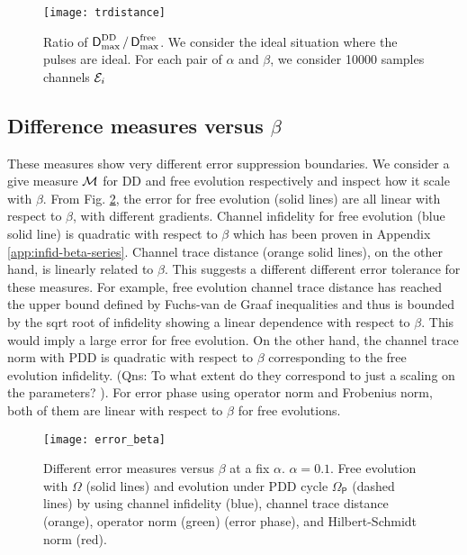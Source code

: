 \documentclass[aps,pra,reprint,superscriptaddress]{revtex4-2}
\newcommand{\Opdd}{\Omega_{\mathsf{P}}}
\begin{document}
\begin{figure}
    \centering
    \texttt{[image: trdistance]}
    \caption{Ratio of $\operatorname{\mathsf{D}}^{\rm DD}_{\rm max} / \operatorname{\mathsf{D}}^{\rm free}_{\rm max}$. We consider the ideal situation where the pulses are ideal. For each pair of $\alpha$ and $\beta$, we consider 10000 samples channels ${\mathcal{E}}_i$} 
    \label{fig:pdd-region-trdistance}
\end{figure}


\subsection{Difference measures versus $\beta$}
These measures show very different error suppression boundaries. We consider a give measure $\mathcal{M}$ for DD and free evolution respectively and inspect how it scale with $\beta$. From Fig. \ref{fig:pdd-region-beta}, the error for free evolution (solid lines) are all linear with respect to $\beta$, with different gradients. Channel infidelity for free evolution (blue solid line) is quadratic with respect to $\beta$ which has been proven in Appendix \ref{app:infid-beta-series}. Channel trace distance (orange solid lines), on the other hand, is linearly related to $\beta$. This suggests a different different error tolerance for these measures. For example, free evolution channel trace distance has reached the upper bound defined by Fuchs-van de Graaf inequalities and thus is bounded by the sqrt root of infidelity showing a linear dependence with respect to $\beta$. This would imply a large error for free evolution. On the other hand, the channel trace norm with PDD is quadratic with respect to $\beta$ corresponding to the free evolution infidelity. ({Qns: \color{red} To what extent do they correspond to just a scaling on the parameters?} ). For error phase using operator norm and Frobenius norm, both of them are linear with respect to $\beta$ for free evolutions.

\begin{figure}
    \centering
    \texttt{[image: error\_beta]}
    \caption{Different error measures versus $\beta$ at a fix $\alpha$. $\alpha=0.1$. Free evolution with $\Omega$ (solid lines) and evolution under PDD cycle $\Opdd$ (dashed lines) by using channel infidelity (blue), channel trace distance (orange), operator norm (green) (error phase), and Hilbert-Schmidt norm (red).} 
    \label{fig:pdd-region-beta}
\end{figure}
\end{document}
